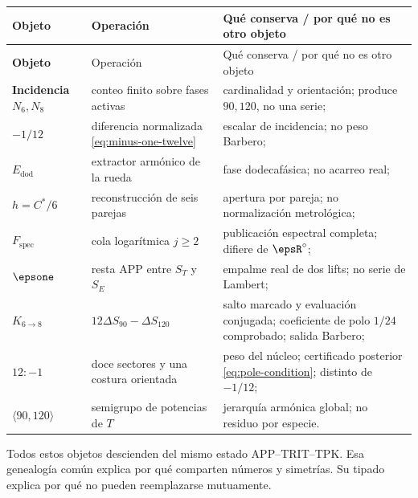 \begin{longtable}{>{\bfseries}p{} p{} p{}}
\toprule
Objeto & Operación & Qué conserva / por qué no es otro objeto\\
\midrule
\endfirsthead
\toprule
Objeto & Operación & Qué conserva / por qué no es otro objeto\\
\midrule
\endhead
Incidencia \(N_6,N_8\) & conteo finito sobre fases activas & cardinalidad y orientación; produce \(90,120\), no una serie;\\
\(-1/12\) & diferencia normalizada \eqref{eq:minus-one-twelve} & escalar de incidencia; no peso Barbero;\\
\(E_{\mathrm{dod}}\) & extractor armónico de la rueda & fase dodecafásica; no acarreo real;\\
\(h=C^*/6\) & reconstrucción de seis parejas & apertura por pareja; no normalización metrológica;\\
\(F_{\mathrm{spec}}\) & cola logarítmica \(j\ge2\) & publicación espectral completa; difiere de \(\epsR^\circ\);\\
\(\epsone\) & resta APP entre \(S_T\) y \(S_E\) & empalme real de dos lifts; no serie de Lambert;\\
\(K_{6\to8}\) & \(12\Delta S_{90}-\Delta S_{120}\) & salto marcado y evaluación conjugada; coeficiente de polo \(1/24\) comprobado; salida Barbero;\\
\(12:-1\) & doce sectores y una costura orientada & peso del núcleo; certificado posterior \eqref{eq:pole-condition}; distinto de \(-1/12\);\\
\(\langle90,120\rangle\) & semigrupo de potencias de \(T\) & jerarquía armónica global; no residuo por especie.\\
\bottomrule
\end{longtable}

\begin{thesisbox}
Todos estos objetos descienden del mismo estado APP--TRIT--TPK. Esa genealogía
común explica por qué comparten números y simetrías. Su tipado explica por qué
no pueden reemplazarse mutuamente.
\end{thesisbox}
